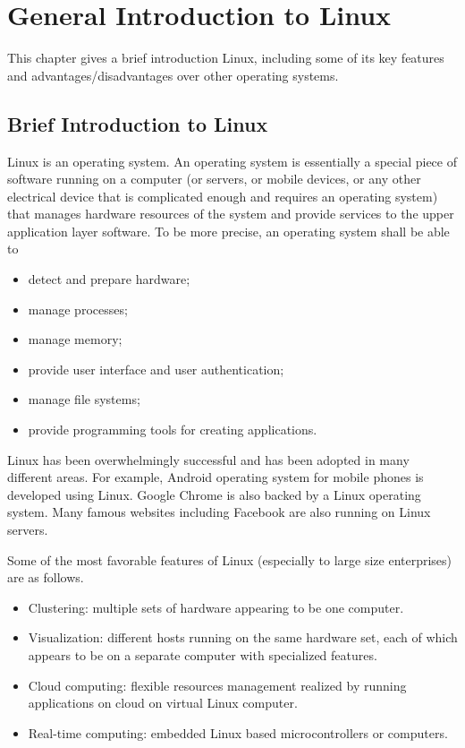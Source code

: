 \chapter{General Introduction to Linux}

This chapter gives a brief introduction Linux, including some of its key features and advantages/disadvantages over other operating systems.

\section{Brief Introduction to Linux}

Linux is an operating system. An operating system is essentially a special piece of software running on a computer (or servers, or mobile devices, or any other electrical device that is complicated enough and requires an operating system) that manages hardware resources of the system and provide services to the upper application layer software. To be more precise, an operating system shall be able to
\begin{itemize}
  \item detect and prepare hardware;
  \item manage processes;
  \item manage memory;
  \item provide user interface and user authentication;
  \item manage file systems;
  \item provide programming tools for creating applications.
\end{itemize}

Linux has been overwhelmingly successful and has been adopted in many different areas. For example, Android operating system for mobile phones is developed using Linux. Google Chrome is also backed by a Linux operating system. Many famous websites including Facebook are also running on Linux servers. 

Some of the most favorable features of Linux (especially to large size enterprises) are as follows. 
\begin{itemize}
  \item Clustering: multiple sets of hardware appearing to be one computer.
  \item Visualization: different hosts running on the same hardware set, each of which appears to be on a separate computer with specialized features.
  \item Cloud computing: flexible resources management realized by running applications on cloud on virtual Linux computer.
  \item Real-time computing: embedded Linux based microcontrollers or computers.
\end{itemize}

